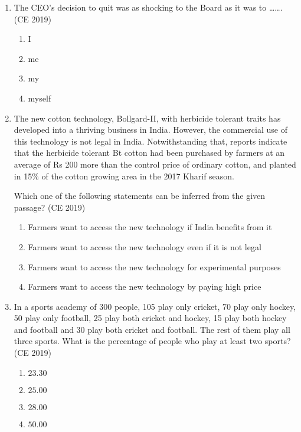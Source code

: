 \documentclass[journal]{IEEEtran}
\begin{document}
\begin{enumerate}
    \item The CEO's decision to quit was as shocking to the Board as it was to \ldots\ldots.  \hfill (CE 2019)
    \begin{multicols}{4}
        \begin{enumerate}
            \item I
            \item me
            \item my
            \item myself
        \end{enumerate}
    \end{multicols}


    \item The new cotton technology, Bollgard-II, with herbicide tolerant traits has developed into a thriving business in India. However, the commercial use of this technology is not legal in India. Notwithstanding that, reports indicate that the herbicide tolerant Bt cotton had been purchased by farmers at an average of Rs 200 more than the control price of ordinary cotton, and planted in 15\% of the cotton growing area in the 2017 Kharif season.

    Which one of the following statements can be inferred from the given passage?  \hfill (CE 2019)

    \begin{enumerate}
        \item Farmers want to access the new technology if India benefits from it
        \item Farmers want to access the new technology even if it is not legal
        \item Farmers want to access the new technology for experimental purposes
        \item Farmers want to access the new technology by paying high price
    \end{enumerate}

    \item In a sports academy of 300 people, 105 play only cricket, 70 play only hockey, 50 play only football, 25 play both cricket and hockey, 15 play both hockey and football and 30 play both cricket and football. The rest of them play all three sports. What is the percentage of people who play at least two sports?  \hfill (CE 2019)

    \begin{multicols}{4}
        \begin{enumerate}
            \item $23.30$
            \item $25.00$
            \item $28.00$
            \item $50.00$
        \end{enumerate}
    \end{multicols}


\end{enumerate}
\end{document}
